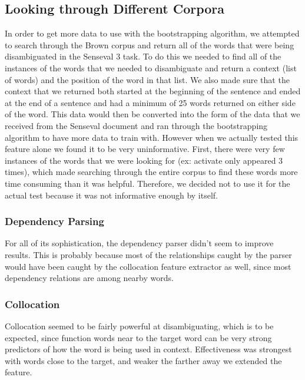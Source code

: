\documentclass{article}
\begin{document}
\subsection{Looking through Different Corpora}

In order to get more data to use with the bootstrapping algorithm, we attempted
to search through the Brown corpus and return all of the words that were being
disambiguated in the Senseval 3 task.  To do this we needed to find all of the
instances of the words that we needed to disambiguate and return a context
(list of words) and the position of the word in that list.  We also made sure
that the context that we returned both started at the beginning of the
sentence and ended at the end of a sentence and had a minimum of 25 words
returned on either side of the word.  This data would then be converted into
the form of the data that we received from the Senseval document and ran
through the bootstrapping algorithm to have more data to train with.  However
when we actually tested this feature alone we found it to be very
uninformative.  First, there were very few instances of the words that we were
looking for (ex: activate only appeared 3 times), which made searching through
the entire corpus to find these words more time consuming than it was helpful.
Therefore, we decided not to use it for the actual test because it was not
informative enough by itself.


\subsubsection{Dependency Parsing}

For all of its sophistication, the dependency parser didn't seem to improve
results.  This is probably because most of the relationships caught by the
parser would have been caught by the collocation feature extractor as well,
since most dependency relations are among nearby words.

\subsubsection{Collocation}

Collocation seemed to be fairly powerful at disambiguating, which is to be
expected, since function words near to the target word can be very strong
predictors of how the word is being used in context.  Effectiveness was
strongest with words close to the target, and weaker the farther away we
extended the feature.
\end{document}
